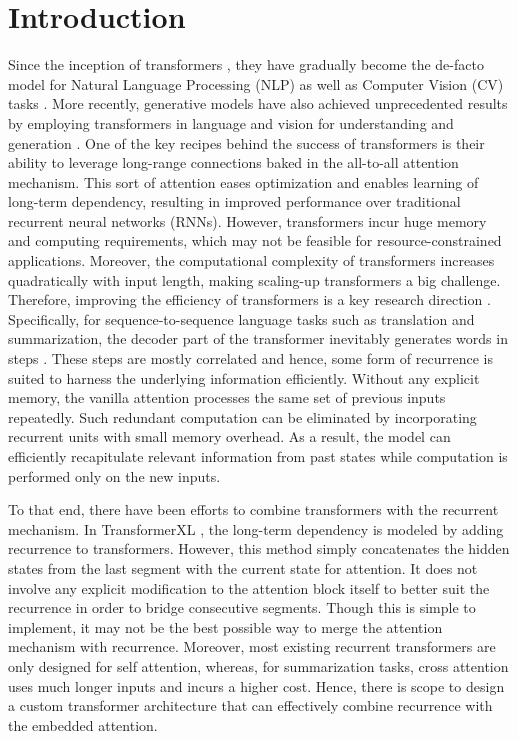 \documentclass[11pt]{article}
\begin{document}
\section{Introduction}
Since the inception of transformers \citep{attention}, they have gradually become the de-facto model for Natural Language Processing (NLP) as well as Computer Vision (CV) tasks \citep{GPT3, ViT}. 
More recently, generative models have also achieved unprecedented results by employing transformers in language and vision for understanding and generation \citep{saharia2022photorealistic, stablediffusion}.
One of the key recipes behind the success of transformers is their ability to leverage long-range connections baked in the all-to-all attention mechanism. This sort of attention eases optimization and enables learning of long-term dependency, resulting in improved performance over traditional recurrent neural networks (RNNs). However, transformers incur huge memory and computing requirements, which may not be feasible for resource-constrained applications. Moreover, the computational complexity of transformers increases quadratically with input length, making scaling-up transformers a big challenge. Therefore, improving the efficiency of transformers is a key research direction \citep{efficient}. Specifically,
for sequence-to-sequence language tasks such as translation and summarization, the decoder part of the transformer inevitably generates words in steps \citep{guo-etal-2022-longt5, unilmv2}. These steps are mostly correlated and hence, some form of recurrence is suited to harness the underlying information efficiently. 
Without any explicit memory, the vanilla attention processes the same set of previous inputs repeatedly. Such redundant computation can be eliminated by incorporating recurrent units with small memory overhead. As a result, the model can efficiently recapitulate relevant information from past states while computation is performed only on the new inputs. 

To that end, there have been efforts to combine transformers with the recurrent mechanism. In TransformerXL \citep{transformerxl}, the long-term dependency is modeled by adding recurrence to transformers. However, this method simply concatenates the hidden states from the last segment with the current state for attention. It does not involve any explicit modification to the attention block itself to better suit the recurrence in order to bridge consecutive segments.  Though this is simple to implement, it may not be the best possible way to merge the attention mechanism with recurrence. Moreover, most existing recurrent transformers are only designed for self attention, whereas, for summarization tasks, cross attention uses much longer inputs and incurs a higher cost.  Hence, there is scope to design a custom transformer architecture that can effectively combine recurrence with the embedded attention. 
\end{document}
